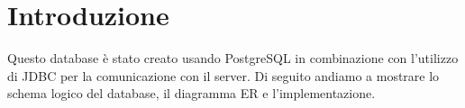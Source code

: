 \section{Introduzione}

	Questo database è stato creato usando PostgreSQL in combinazione con l’utilizzo di JDBC per la comunicazione con il server. Di seguito andiamo a mostrare lo schema logico del database, il diagramma ER e l’implementazione.